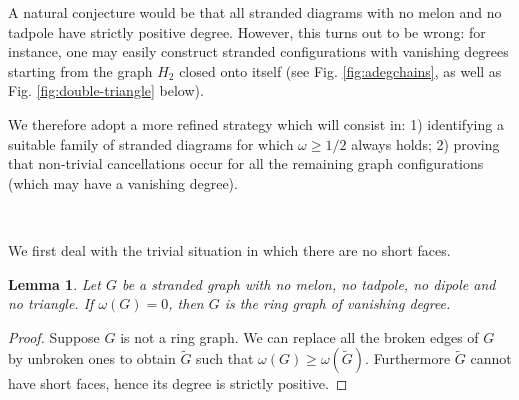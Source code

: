 \documentclass[10pt]{article}
\theoremstyle{plain}
\newtheorem{lemma}{Lemma}
\theoremstyle{definition}
\begin{document}
A natural conjecture would be that all stranded diagrams with no melon and no tadpole have strictly positive degree. However, this turns out to be wrong: for instance, one may easily construct stranded configurations with vanishing degrees starting from the graph $H_2$ closed onto itself (see Fig. \ref{fig:adegchains}, as well as Fig. \ref{fig:double-triangle} below). 

We therefore adopt a more refined strategy which will consist in: 1) identifying a suitable family of stranded diagrams for which $\omega \geq 1/2$ always holds; 2) proving that non-trivial cancellations occur for all the remaining graph configurations (which may have a vanishing degree).  

\

We first deal with the trivial situation in which there are no short faces.

\begin{lemma}\label{lem:LO-noshort}
Let $G$ be a stranded graph with no melon, no tadpole, no dipole and no triangle. If $\omega(G) =0$, then $G$ is the ring graph of vanishing degree.
\end{lemma}
\begin{proof}
Suppose $G$ is not a ring graph. We can replace all the broken edges of $G$ by unbroken ones to obtain $\tilde{G}$ such that $\omega(G) \geq \omega(\tilde{G})$. Furthermore $\tilde{G}$ cannot have short faces, hence its degree is strictly positive. 
\end{proof}

\
\end{document}
